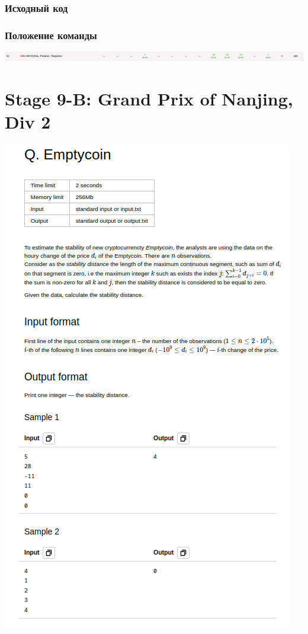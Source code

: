 \documentclass[12pt]{article}
\begin{document}
\subsubsection*{Исходный код}

\subsubsection*{Положение команды}
\includegraphics[scale=0.5]{images/8.png}\newline\noindent

\pagebreak
\section{Stage 9-B: Grand Prix of Nanjing, Div 2}
\includegraphics[scale=0.75]{statements/9_Q.png}
\end{document}
